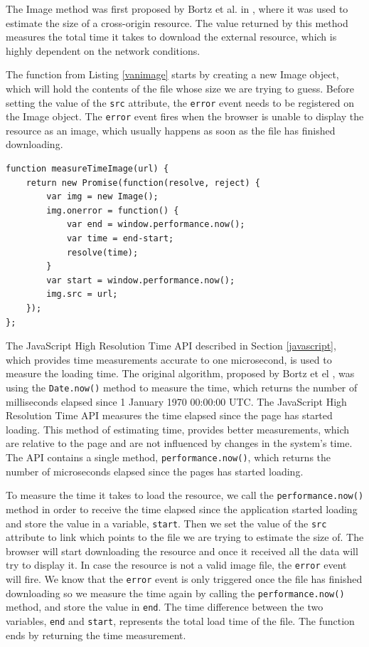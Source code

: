 \documentclass[10pt,a4paper,twoside]{book}
\begin{document}
The Image method was first proposed by Bortz et al. in \cite{bortz2007exposing}, where it was used to estimate the size of a cross-origin resource. The value returned by this method measures the total time it takes to download the external resource, which is highly dependent on the network conditions. 

The function from Listing \ref{vanimage} starts by creating a new Image object, which will hold the contents of the file whose size we are trying to guess. Before setting the value of the \texttt{src} attribute, the \texttt{error} event needs to be registered on the Image object. The \texttt{error} event fires when the browser is unable to display the resource as an image, which usually happens as soon as the file has finished downloading. 

\begin{lstlisting}[caption={Measuring the load time of an external resource as an Image},label={vanimage}]
function measureTimeImage(url) {
    return new Promise(function(resolve, reject) {
        var img = new Image();
        img.onerror = function() {
            var end = window.performance.now();
            var time = end-start;
            resolve(time);
        }
        var start = window.performance.now();
        img.src = url;
    });
};
\end{lstlisting}

The JavaScript High Resolution Time API described in Section \ref{javascript}, which provides time measurements accurate to one microsecond, is used to measure the loading time. The original algorithm, proposed by Bortz et el \cite{bortz2007exposing}, was using the \texttt{Date.now()} \cite{datenow} method to measure the time, which returns the number of milliseconds elapsed since 1 January 1970 00:00:00 UTC. The JavaScript High Resolution Time API measures the time elapsed since the page has started loading. This method of estimating time, provides better measurements, which are relative to the page and are not influenced by changes in the system's time. The API contains a single method, \texttt{performance.now()}, which returns the number of microseconds elapsed since the pages has started loading.

To measure the time it takes to load the resource, we call the \texttt{performance.now()} method in order to receive the time elapsed since the application started loading and store the value in a variable, \texttt{start}. Then we set the value of the \texttt{src} attribute to link which points to the file we are trying to estimate the size of. The browser will start downloading the resource and once it received all the data will try to display it. In case the resource is not a valid image file, the \texttt{error} event will fire. We know that the \texttt{error} event is only triggered once the file has finished downloading so we measure the time again by calling the \texttt{performance.now()} method, and store the value in \texttt{end}. The time difference between the two variables, \texttt{end} and \texttt{start}, represents the total load time of the file. The function ends by returning the time measurement.
\end{document}
